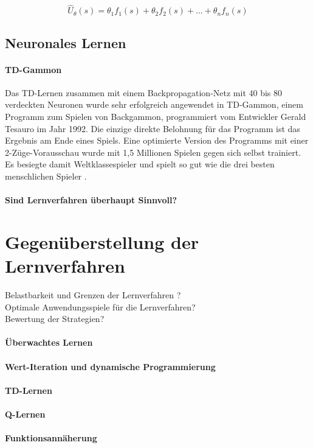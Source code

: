 \begin{equation*}
\hat{U}_\theta(s) = \theta_1 f_1(s) + \theta_2 f_2(s) + ... + \theta_n f_n(s)
\end{equation*}

\subsection{Neuronales Lernen}
\label{subsec:Neuronales Lernen}

\paragraph{TD-Gammon}
Das TD-Lernen zusammen mit einem Backpropagation-Netz mit 40 bis 80 verdeckten Neuronen wurde sehr erfolgreich angewendet in TD-Gammon, einem Programm zum Spielen von Backgammon, programmiert vom Entwickler Gerald Tesauro im Jahr 1992. Die einzige direkte Belohnung für das Programm ist das Ergebnis am Ende eines Spiels. Eine optimierte Version des Programms mit einer 2-Züge-Vorausschau wurde mit 1,5 Millionen Spielen gegen sich selbst trainiert. Es besiegte damit Weltklassespieler und spielt so gut wie die drei besten menschlichen Spieler \cite[304]{Ertel}.  

\paragraph{Sind Lernverfahren überhaupt Sinnvoll?}

\section{Gegenüberstellung der Lernverfahren}
Belastbarkeit und Grenzen der Lernverfahren ? \\
Optimale Anwendungsspiele für die Lernverfahren? \\
Bewertung der Strategien?
\paragraph{Überwachtes Lernen}
\paragraph{Wert-Iteration und dynamische Programmierung}
\paragraph{TD-Lernen}
\paragraph{Q-Lernen}
\paragraph{Funktionsannäherung}